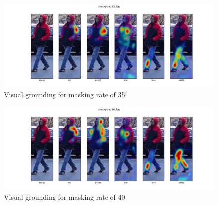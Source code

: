 \begin{figure}[htbp]
  \includegraphics[width=\linewidth]{img/mrtd_masking_ratio/mrtd-checkpoint_35_flat.png}
  \caption{Visual grounding for masking rate of 35}
  \label{fig:mtrd_5}
\end{figure}

\begin{figure}[htbp]
  \includegraphics[width=\linewidth]{img/mrtd_masking_ratio/mrtd-checkpoint_40_flat.png}
  \caption{Visual grounding for masking rate of 40}
  \label{fig:mtrd_6}
\end{figure}